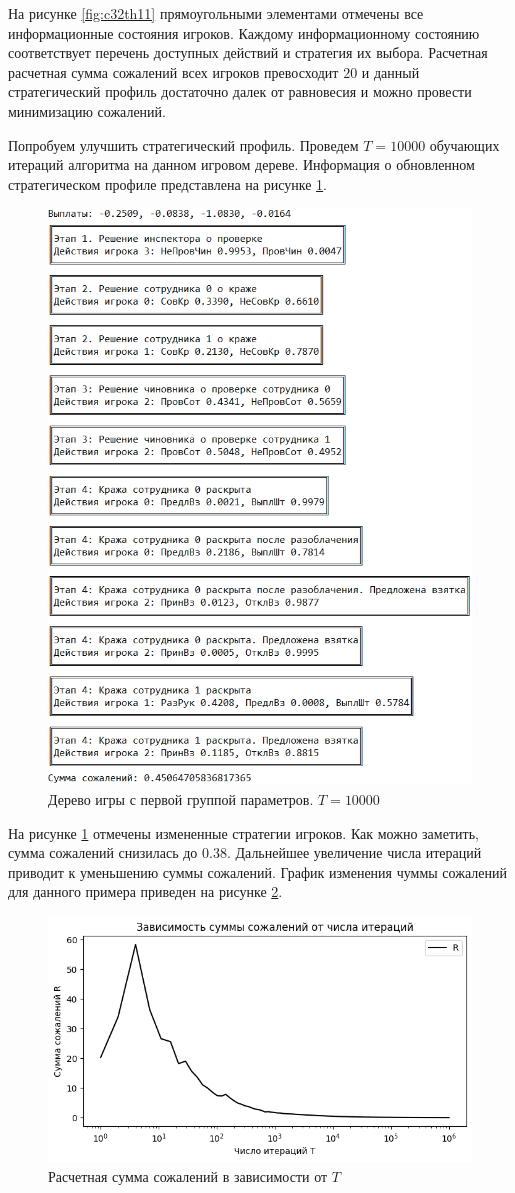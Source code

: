 \par
На рисунке \ref{fig:c32th11} прямоугольными элементами отмечены все информационные состояния игроков. Каждому информационному состоянию соответствует перечень доступных действий и стратегия их выбора. Расчетная расчетная сумма сожалений всех игроков превосходит $20$ и данный стратегический профиль достаточно далек от равновесия и можно провести минимизацию сожалений.
\par
Попробуем улучшить стратегический профиль. Проведем $T=10000$ обучающих итераций алгоритма на данном игровом дереве. Информация о обновленном стратегическом профиле представлена на рисунке \ref{fig:c32th12}.
\begin{figure}[H]
	\centering
	\includegraphics[width=0.8\linewidth]{inc/img/c32th12}
	\caption{Дерево игры с первой группой параметров. $T = 10000$}
	\label{fig:c32th12}
\end{figure}
\par
На рисунке \ref{fig:c32th12} отмечены измененные стратегии игроков. Как можно заметить, сумма сожалений снизилась до $0.38$. Дальнейшее увеличение числа итераций приводит к уменьшению суммы сожалений. График изменения чуммы сожалений для данного примера приведен на рисунке \ref{fig:c3r2}.

\begin{figure}[H]
	\centering
	\includegraphics[width=0.8\linewidth]{inc/img/c3r2}
	\caption{Расчетная сумма сожалений в зависимости от $T$}
	\label{fig:c3r2}
\end{figure}